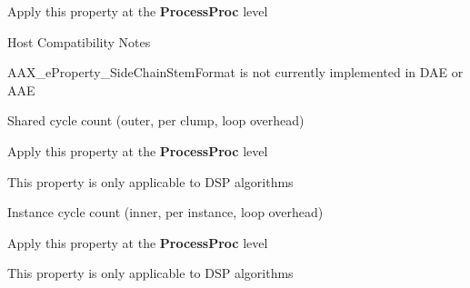\begin{Desc}
\begin{description}
\begin{DoxyItemize}
\item Apply this property at the {\bfseries Process\+Proc} level\end{DoxyItemize}
\begin{DoxyRefDesc}{Host Compatibility Notes}
\item[\hyperlink{a00380__compatibility_notes000064}{Host Compatibility Notes}]A\+A\+X\+\_\+e\+Property\+\_\+\+Side\+Chain\+Stem\+Format is not currently implemented in D\+A\+E or A\+A\+E \end{DoxyRefDesc}
\item[{\em 
\hypertarget{a00283_a6571f4e41a5dd06e4067249228e2249ea3e5b289333ba49f5a33de40d89fa4ade}{}A\+A\+X\+\_\+e\+Property\+\_\+\+T\+I\+\_\+\+Shared\+Cycle\+Count\label{a00283_a6571f4e41a5dd06e4067249228e2249ea3e5b289333ba49f5a33de40d89fa4ade}
}]Shared cycle count (outer, per clump, loop overhead) \begin{DoxyItemize}
\item Apply this property at the {\bfseries Process\+Proc} level \item This property is only applicable to D\+S\+P algorithms \end{DoxyItemize}
\item[{\em 
\hypertarget{a00283_a6571f4e41a5dd06e4067249228e2249ea5d8e5be9f3698a9c67a578c29da66405}{}A\+A\+X\+\_\+e\+Property\+\_\+\+T\+I\+\_\+\+Instance\+Cycle\+Count\label{a00283_a6571f4e41a5dd06e4067249228e2249ea5d8e5be9f3698a9c67a578c29da66405}
}]Instance cycle count (inner, per instance, loop overhead) \begin{DoxyItemize}
\item Apply this property at the {\bfseries Process\+Proc} level \item This property is only applicable to D\+S\+P algorithms \end{DoxyItemize}

\end{description}
\end{Desc}

